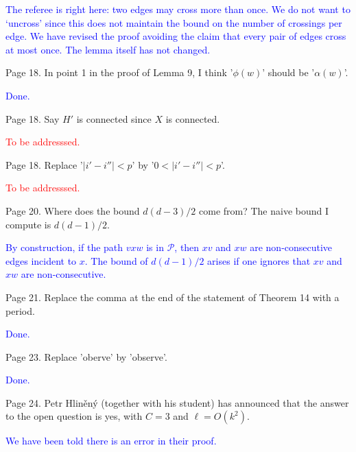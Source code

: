 \documentclass[12pt]{article}
\newcommand{\done}{\textcolor{blue}{Done.}}
\newcommand{\tba}{\textcolor{red}{To be addresssed.}}
\begin{document}
\textcolor{blue}{The referee is right here: two edges may cross more than once. We do not want to `uncross' since this does not maintain the bound on the number of crossings per edge. We have revised the proof avoiding the claim that every pair of edges cross at most once. The lemma itself has not changed. }

Page 18. In point 1 in the proof of Lemma 9, I think '$\phi(w)$' should
be '$\alpha(w)$'.

\done

Page 18.  Say $H'$ is connected since $X$ is connected.

\tba

Page 18.  Replace '$|i'-i''| < p$' by  '$0< |i'-i''| < p$'.

\tba

Page 20.  Where does the bound $d(d-3)/2$ come from?  The naive bound I
compute is $d(d-1)/2$.

\textcolor{blue}{By construction, if the path $vxw$ is in $\mathcal{P}$, then $xv$ and $xw$ are non-consecutive edges incident to $x$. The bound of $d(d-1)/2$ arises if one ignores that $xv$ and $xw$ are non-consecutive.}


Page 21.  Replace the comma at the end of the statement of Theorem 14
with a period.

\done

Page 23. Replace 'oberve' by 'observe'.

\done

Page 24. Petr Hliněný (together with his student) has announced that
the answer to the open question is yes, with $C=3$ and $\ell=O(k^2)$.

\textcolor{blue}{We have been told there is an error in their proof.}
\end{document}
